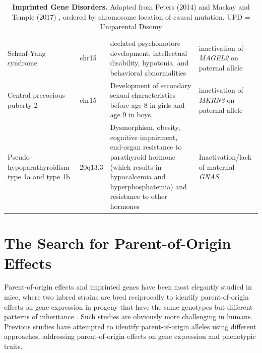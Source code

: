 \begin{table}
\begin{adjustbox}{width=1\textwidth}
\begin{tabular}{@{}p{3cm}p{2cm}p{7cm}p{7cm}@{}}
Schaaf-Yang syndrome\cite{Fountain:2017dd} & chr15  & deelated psychomotore development, intellectual disability, hypotonia, and behavioral abnormalities & inactivation of \emph{MAGEL2} on paternal allele\\
Central precocious puberty 2\cite{Abreu:2013je} & chr15 & Development of secondary sexual characteristics before age 8 in girls and age 9 in boys. & inactivation of \emph{MKRN3} on paternal allele\\
Pseudo-hypoparathyroidism type 1a and type 1b\cite{Mantovani:2016em,Elli:2016et}  & 20q13.3 & Dysmorphism, obesity, cognitive impairment, end-organ resistance to parathyroid hormone (which results in hypocalcemia and hyperphosphatemia) and resistance to other hormones & Inactivation/lack of maternal \emph{GNAS} \\ 

\bottomrule
\end{tabular}
\end{adjustbox}
\caption[Imprinted Gene Disorders.]{\textbf{Imprinted Gene Disorders.} Adapted from Peters (2014) and Mackay and Temple (2017) \cite{Peters2014,Mackay:2017kn}, ordered by chromosome location of causal mutation. UPD = Uniparental Disomy}
\label{tab:imprinteddisease}
\end{table}



\section{The Search for Parent-of-Origin Effects}

Parent-of-origin effects and imprinted genes have been most elegantly studied in mice, where two inbred strains are bred reciprocally to identify parent-of-origin effects on gene expression in progeny that have the same genotypes but different patterns of inheritance \cite{Babak2012}. Such studies are obviously more challenging in humans. Previous studies have attempted to identify parent-of-origin alleles using different approaches, addressing parent-of-origin effects on gene expression and phenotypic traits.

